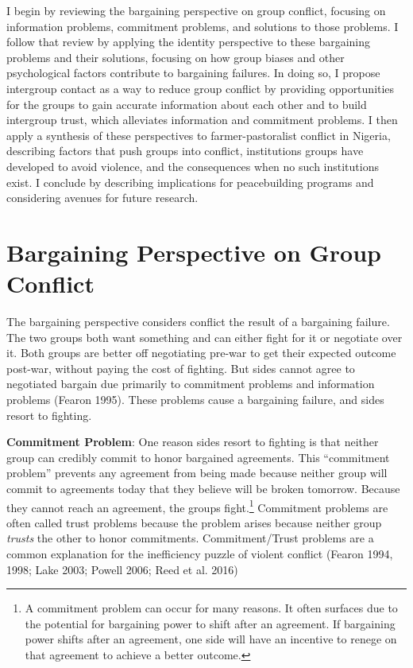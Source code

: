 \documentclass[11pt]{article}
\begin{document}
I begin by reviewing the bargaining perspective on group conflict,
focusing on information problems, commitment problems, and solutions to
those problems. I follow that review by applying the identity
perspective to these bargaining problems and their solutions, focusing
on how group biases and other psychological factors contribute to
bargaining failures. In doing so, I propose intergroup contact as a way
to reduce group conflict by providing opportunities for the groups to
gain accurate information about each other and to build intergroup
trust, which alleviates information and commitment problems. I then
apply a synthesis of these perspectives to farmer-pastoralist conflict
in Nigeria, describing factors that push groups into conflict,
institutions groups have developed to avoid violence, and the
consequences when no such institutions exist. I conclude by describing
implications for peacebuilding programs and considering avenues for
future research.

\hypertarget{bargaining-perspective-on-group-conflict}{%
\section{Bargaining Perspective on Group
Conflict}\label{bargaining-perspective-on-group-conflict}}

The bargaining perspective considers conflict the result of a bargaining
failure. The two groups both want something and can either fight for it
or negotiate over it. Both groups are better off negotiating pre-war to
get their expected outcome post-war, without paying the cost of
fighting. But sides cannot agree to negotiated bargain due primarily to
commitment problems and information problems (Fearon 1995). These
problems cause a bargaining failure, and sides resort to fighting.

\textbf{Commitment Problem}: One reason sides resort to fighting is that
neither group can credibly commit to honor bargained agreements. This
``commitment problem'' prevents any agreement from being made because
neither group will commit to agreements today that they believe will be
broken tomorrow. Because they cannot reach an agreement, the groups
fight.\footnote{A commitment problem can occur for many reasons. It
  often surfaces due to the potential for bargaining power to shift
  after an agreement. If bargaining power shifts after an agreement, one
  side will have an incentive to renege on that agreement to achieve a
  better outcome.} Commitment problems are often called trust problems
because the problem arises because neither group \emph{trusts} the other
to honor commitments. Commitment/Trust problems are a common explanation
for the inefficiency puzzle of violent conflict (Fearon 1994, 1998; Lake
2003; Powell 2006; Reed et al. 2016)
\end{document}
